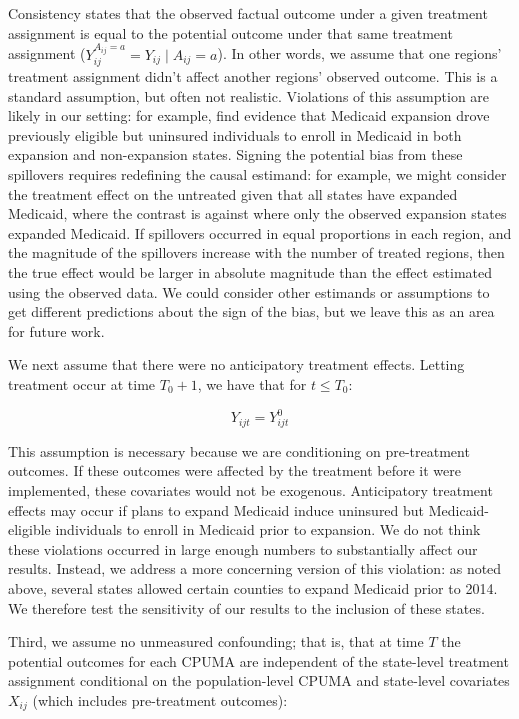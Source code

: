 \documentclass[12pt]{article}
\begin{document}
Consistency states that the observed factual outcome under a given treatment assignment is equal to the potential outcome under that same treatment assignment ($Y_{ij}^{A_{ij} = a} = Y_{ij} \mid A_{ij} = a$). In other words, we assume that one regions' treatment assignment didn't affect another regions' observed outcome. This is a standard assumption, but often not realistic. Violations of this assumption are likely in our setting: for example, \cite{frean2017premium} find evidence that Medicaid expansion drove previously eligible but uninsured individuals to enroll in Medicaid in both expansion and non-expansion states. Signing the potential bias from these spillovers requires redefining the causal estimand: for example, we might consider the treatment effect on the untreated given that all states have expanded Medicaid, where the contrast is against where only the observed expansion states expanded Medicaid. If spillovers occurred in equal proportions in each region, and the magnitude of the spillovers increase with the number of treated regions, then the true effect would be larger in absolute magnitude than the effect estimated using the observed data. We could consider other estimands or assumptions to get different predictions about the sign of the bias, but we leave this as an area for future work.

We next assume that there were no anticipatory treatment effects. Letting treatment occur at time $T_0 + 1$, we have that for $t \le T_0$:

$$
Y_{ijt} = Y_{ijt}^0
$$

This assumption is necessary because we are conditioning on pre-treatment outcomes. If these outcomes were affected by the treatment before it were implemented, these covariates would not be exogenous. Anticipatory treatment effects may occur if plans to expand Medicaid induce uninsured but Medicaid-eligible individuals to enroll in Medicaid prior to expansion. We do not think these violations occurred in large enough numbers to substantially affect our results. Instead, we address a more concerning version of this violation: as noted above, several states allowed certain counties to expand Medicaid prior to 2014. We therefore test the sensitivity of our results to the inclusion of these states.

Third, we assume no unmeasured confounding; that is, that at time $T$ the potential outcomes for each CPUMA are independent of the state-level treatment assignment conditional on the population-level CPUMA and state-level covariates $X_{ij}$ (which includes pre-treatment outcomes):
\end{document}
